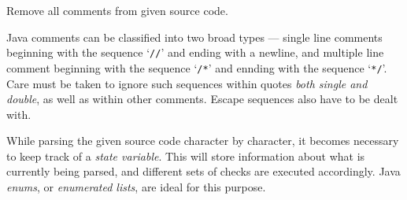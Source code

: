 

\problem Remove all comments from given source code.

\solution
Java comments can be classified into two broad types --- single line comments beginning with the sequence `\texttt{//}' and
ending with a newline, and multiple line comment beginning with the sequence `\texttt{/*}' and ennding with the sequence `\texttt{*/}'.
Care must be taken to ignore such sequences within quotes \textit{both single and double}, as well as within other comments.
Escape sequences also have to be dealt with.

While parsing the given source code character by character, it becomes necessary to keep track of a \textit{state variable}. This
will store information about what is currently being parsed, and different sets of checks are executed accordingly. Java \textit{enums}, 
or \textit{enumerated lists}, are ideal for this purpose.

